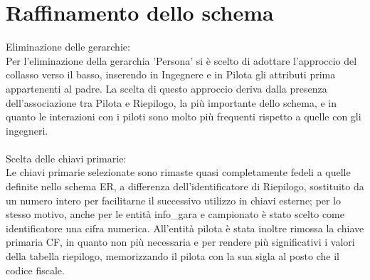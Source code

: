 \documentclass[a4paper,12pt]{report}
\begin{document}
	\section{Raffinamento dello schema}
	Eliminazione delle gerarchie:\\
	Per l'eliminazione della gerarchia 'Persona' si è scelto di adottare l'approccio del collasso verso il basso,
	inserendo in Ingegnere e in Pilota gli attributi prima appartenenti al padre.
	La scelta di questo approccio deriva dalla presenza dell'associazione tra Pilota e Riepilogo, la più importante dello schema, e in quanto le interazioni con i piloti sono molto più frequenti rispetto a quelle con gli ingegneri.
	\\\\
	Scelta delle chiavi primarie:\\
	Le chiavi primarie selezionate sono rimaste quasi completamente fedeli a quelle definite nello schema ER,
	a differenza dell'identificatore di Riepilogo, sostituito da un numero intero per facilitarne il successivo utilizzo
	in chiavi esterne; per lo stesso motivo, anche per le entità info\_gara e campionato è stato scelto come identificatore
	una cifra numerica.
	All'entità pilota è stata inoltre rimossa la chiave primaria CF, in quanto non più necessaria e per rendere
	più significativi i valori della tabella riepilogo, memorizzando il pilota con la sua sigla al posto che il codice fiscale.
\end{document}
